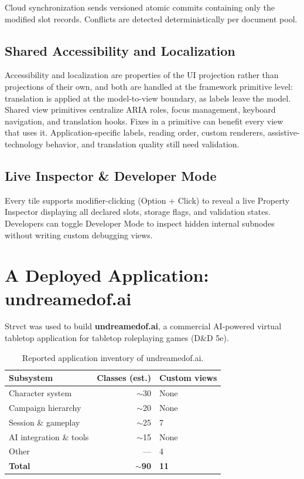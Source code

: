 \documentclass[sigplan,review,anonymous,10pt]{acmart}
\begin{document}
Cloud synchronization sends versioned atomic commits containing only the modified slot records. Conflicts are detected deterministically per document pool.

\subsection{Shared Accessibility and Localization}

Accessibility and localization are properties of the UI projection rather than projections of their own, and both are handled at the framework primitive level: translation is applied at the model-to-view boundary, as labels leave the model. Shared view primitives centralize ARIA roles, focus management, keyboard navigation, and translation hooks. Fixes in a primitive can benefit every view that uses it. Application-specific labels, reading order, custom renderers, assistive-technology behavior, and translation quality still need validation.

\subsection{Live Inspector \& Developer Mode}
\label{sec:inspector}

Every tile supports modifier-clicking (Option + Click) to reveal a live Property Inspector displaying all declared slots, storage flags, and validation states. Developers can toggle Developer Mode to inspect hidden internal subnodes without writing custom debugging views.

\section{A Deployed Application: undreamedof.ai}
\label{sec:case-study}

Strvct was used to build \textbf{undreamedof.ai}, a commercial AI-powered virtual tabletop application for tabletop roleplaying games (D\&D 5e).

\begin{table}[h]
\centering
\begin{tabular}{lrl}
\hline
Subsystem & Classes (est.) & Custom views \\
\hline
Character system & $\sim$30 & None \\
Campaign hierarchy & $\sim$20 & None \\
Session \& gameplay & $\sim$25 & 7 \\
AI integration \& tools & $\sim$15 & None \\
Other & --- & 4 \\
\hline
\textbf{Total} & \textbf{$\sim$90} & \textbf{11} \\
\hline
\end{tabular}
\caption{Reported application inventory of undreamedof.ai.}
\label{tab:breakdown}
\end{table}
\end{document}
